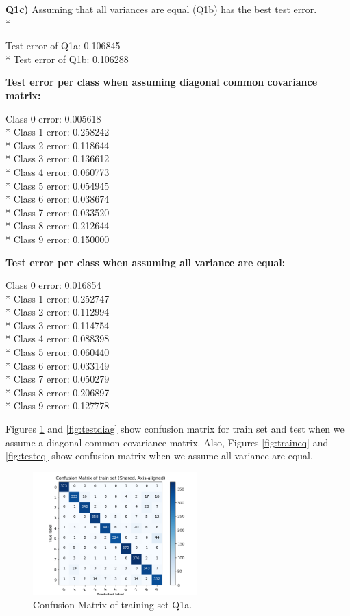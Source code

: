 \documentclass[12pt]{article}
\begin{document}
\textbf{Q1c)} Assuming that all variances are equal (Q1b) has the best test error.\\*
\begin{center}
		Test error of Q1a: 0.106845\\* 
		Test error of Q1b: 0.106288	\\
\end{center}
\textbf{Test error per class when assuming diagonal common covariance matrix:}
\begin{center}
	Class 0 error: 0.005618\\* 
	Class 1 error: 0.258242\\* 
	Class 2 error: 0.118644\\* 
	Class 3 error: 0.136612\\* 
	Class 4 error: 0.060773\\* 
	Class 5 error: 0.054945\\* 
	Class 6 error: 0.038674\\* 
	Class 7 error: 0.033520\\* 
	Class 8 error: 0.212644\\* 
	Class 9 error: 0.150000 
\end{center}
\textbf{Test error per class when assuming all variance are equal:}
\begin{center}
Class 0 error: 0.016854 \\*
Class 1 error: 0.252747 \\*
Class 2 error: 0.112994 \\*
Class 3 error: 0.114754 \\*
Class 4 error: 0.088398 \\*
Class 5 error: 0.060440 \\*
Class 6 error: 0.033149 \\*
Class 7 error: 0.050279 \\*
Class 8 error: 0.206897 \\*
Class 9 error: 0.127778 
\end{center}
Figures \ref{fig:traindiag} and \ref{fig:testdiag} show confusion matrix for train set and test when we assume a diagonal common covariance matrix. Also, Figures \ref{fig:traineq} and \ref{fig:testeq} show confusion matrix when we assume all variance are equal.\\
\begin{figure}[ht]
  \centerline{\includegraphics[width=2.5in]{traindiag.png}}
  \caption{Confusion Matrix of training set Q1a.}
  \label{fig:traindiag}
\end{figure}
\end{document}
